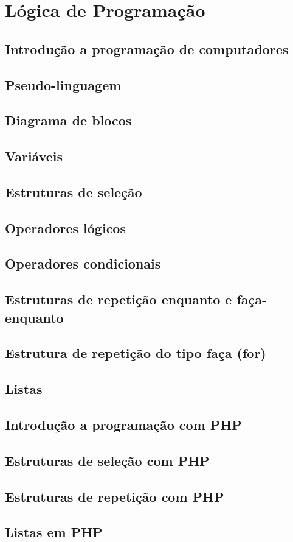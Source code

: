 \section{Lógica de Programação}

\subsection{Introdução a programação de computadores}

\subsection{Pseudo-linguagem}

\subsection{Diagrama de blocos}

\subsection{Variáveis}

\subsection{Estruturas de seleção}

\subsection{Operadores lógicos}

\subsection{Operadores condicionais}

\subsection{Estruturas de repetição enquanto e faça-enquanto}

\subsection{Estrutura de repetição do tipo faça (for)}

\subsection{Listas}

\subsection{Introdução a programação com PHP}

\subsection{Estruturas de seleção com PHP}

\subsection{Estruturas de repetição com PHP}

\subsection{Listas em PHP}
